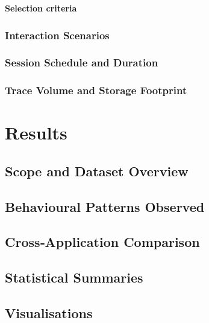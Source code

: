 \documentclass[a4paper,12pt]{report}
\begin{document}
\textbf{Selection criteria}


\subsection{Interaction Scenarios}\label{sec:scenarios}

\noindent


\subsection{Session Schedule and Duration}\label{sec:schedule}


\subsection{Trace Volume and Storage Footprint}\label{sec:trace-volume}


\chapter{Results}
\section{Scope and Dataset Overview}\label{sec:results:dataset}

\section{Behavioural Patterns Observed}\label{sec:results:patterns}

\section{Cross‑Application Comparison}\label{sec:results:comparison}

\section{Statistical Summaries}\label{sec:results:stats}

\section{Visualisations}\label{sec:results:viz}

\end{document}
